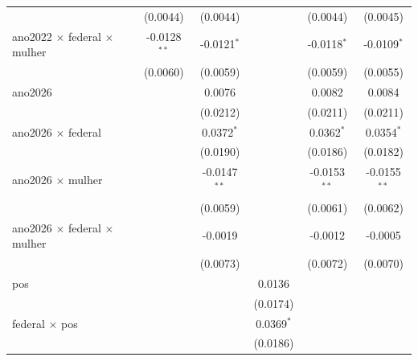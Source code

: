\begin{tabular}{lccccc}
                                              & (0.0044)              & (0.0044)        &                 & (0.0044)           & (0.0045)\\   
   ano2022 $\times$ federal $\times$ mulher   & -0.0128$^{**}$        & -0.0121$^{*}$   &                 & -0.0118$^{*}$      & -0.0109$^{*}$\\   
                                              & (0.0060)              & (0.0059)        &                 & (0.0059)           & (0.0055)\\   
   ano2026                                    &                       & 0.0076          &                 & 0.0082             & 0.0084\\   
                                              &                       & (0.0212)        &                 & (0.0211)           & (0.0211)\\   
   ano2026 $\times$ federal                   &                       & 0.0372$^{*}$    &                 & 0.0362$^{*}$       & 0.0354$^{*}$\\   
                                              &                       & (0.0190)        &                 & (0.0186)           & (0.0182)\\   
   ano2026 $\times$ mulher                    &                       & -0.0147$^{**}$  &                 & -0.0153$^{**}$     & -0.0155$^{**}$\\   
                                              &                       & (0.0059)        &                 & (0.0061)           & (0.0062)\\   
   ano2026 $\times$ federal $\times$ mulher   &                       & -0.0019         &                 & -0.0012            & -0.0005\\   
                                              &                       & (0.0073)        &                 & (0.0072)           & (0.0070)\\   
   pos                                        &                       &                 & 0.0136          &                    &   \\   
                                              &                       &                 & (0.0174)        &                    &   \\   
   federal $\times$ pos                       &                       &                 & 0.0369$^{*}$    &                    &   \\   
                                              &                       &                 & (0.0186)        &                    &   \\   

\end{tabular}
